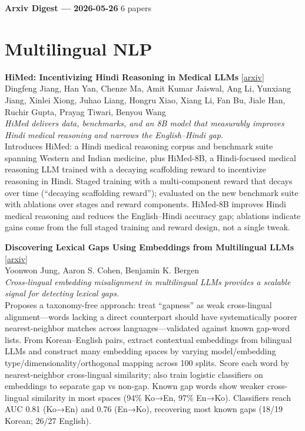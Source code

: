 \documentclass[12pt,letterpaper]{article}
\begin{document}
{\footnotesize\textbf{Arxiv Digest --- 2026-05-26} \hfill 6 papers}

\smallskip

\section*{Multilingual NLP}

{\small\textbf{HiMed: Incentivizing Hindi Reasoning in Medical LLMs}} {\scriptsize[\href{https://arxiv.org/abs/2605.24635}{arxiv}]}\\
{\scriptsize Dingfeng Jiang, Han Yan, Chenze Ma, Amit Kumar Jaiswal, Ang Li, Yunxiang Jiang, Xinlei Xiong, Juhao Liang, Hongru Xiao, Xiang Li, Fan Bu, Jiale Han, Ruchir Gupta, Prayag Tiwari, Benyou Wang}\\

{\small\textit{HiMed delivers data, benchmarks, and an 8B model that measurably improves Hindi medical reasoning and narrows the English--Hindi gap.}}\\[1pt]
{\footnotesize Introduces HiMed: a Hindi medical reasoning corpus and benchmark suite spanning Western and Indian medicine, plus HiMed-8B, a Hindi-focused medical reasoning LLM trained with a decaying scaffolding reward to incentivize reasoning in Hindi. Staged training with a multi-component reward that decays over time (``decaying scaffolding reward''); evaluated on the new benchmark suite with ablations over stages and reward components. HiMed-8B improves Hindi medical reasoning and reduces the English--Hindi accuracy gap; ablations indicate gains come from the full staged training and reward design, not a single tweak.}

\medskip

{\small\textbf{Discovering Lexical Gaps Using Embeddings from Multilingual LLMs}} {\scriptsize[\href{https://arxiv.org/abs/2605.24310}{arxiv}]}\\
{\scriptsize Yoonwon Jung, Aaron S. Cohen, Benjamin K. Bergen}\\

{\small\textit{Cross-lingual embedding misalignment in multilingual LLMs provides a scalable signal for detecting lexical gaps.}}\\[1pt]
{\footnotesize Proposes a taxonomy-free approach: treat ``gapness'' as weak cross-lingual alignment---words lacking a direct counterpart should have systematically poorer nearest-neighbor matches across languages---validated against known gap-word lists. From Korean--English pairs, extract contextual embeddings from bilingual LLMs and construct many embedding spaces by varying model/embedding type/dimensionality/orthogonal mapping across 100 splits. Score each word by nearest-neighbor cross-lingual similarity; also train logistic classifiers on embeddings to separate gap vs non-gap. Known gap words show weaker cross-lingual similarity in most spaces (94\% Ko→En, 97\% En→Ko). Classifiers reach AUC 0.81 (Ko→En) and 0.76 (En→Ko), recovering most known gaps (18/19 Korean; 26/27 English).}
\end{document}
